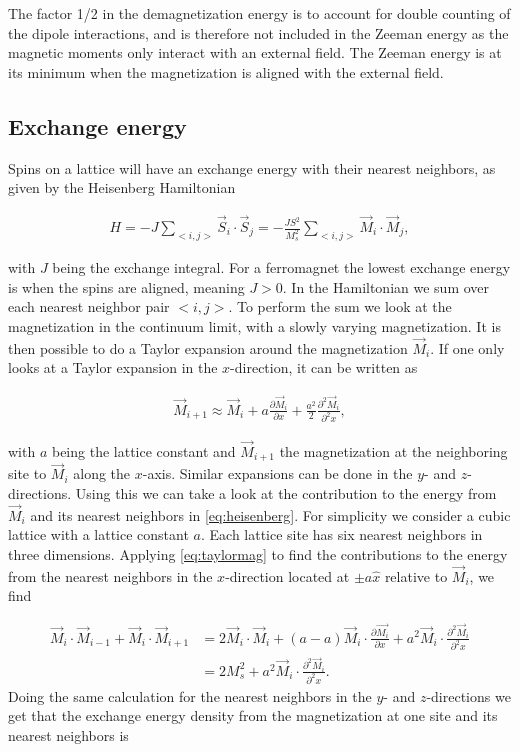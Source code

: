 \documentclass[1p]{elsarticle}		%
\begin{document}
The factor 1/2 in the demagnetization energy is to account for double counting of the dipole interactions, and is therefore not included in the Zeeman energy as the magnetic moments only interact with an external field. The Zeeman energy is at its minimum when the magnetization is aligned with the external field.

\subsection{Exchange energy}
Spins on a lattice will have an exchange energy with their nearest neighbors, as given by the Heisenberg Hamiltonian

\begin{align}
\label{eq:heisenberg}
H = -J\sum_{<i, j>} \vec{S}_i\cdot\vec{S}_j = -\frac{J S^2}{M_s^2}\sum_{<i, j>} \vec{M}_i\cdot\vec{M}_j,
\end{align}

with $J$ being the exchange integral. For a ferromagnet the lowest exchange energy is when the spins are aligned, meaning $J>0$. In the Hamiltonian we sum over each nearest neighbor pair $<i, j>$. To perform the sum we look at the magnetization in the continuum limit, with a slowly varying magnetization. It is then possible to do a Taylor expansion around the magnetization $\vec{M}_i$. If one only looks at a Taylor expansion in the $x$-direction, it can be written as

\begin{align}
\label{eq:taylormag}
\vec{M}_{i+1} \approx \vec{M}_i + a\frac{\partial \vec{M}_i}{\partial x} + \frac{a^2}{2}\frac{\partial^2 \vec{M}_i}{\partial^2 x},
\end{align}

with $a$ being the lattice constant and $\vec{M}_{i+1}$ the magnetization at the neighboring site to $\vec{M}_i$ along the $x$-axis. Similar expansions can be done in the $y$- and $z$-directions. Using this we can take a look at the contribution to the energy from $\vec{M}_i$ and its nearest neighbors in \eqref{eq:heisenberg}. For simplicity we consider a cubic lattice with a lattice constant $a$. Each lattice site has six nearest neighbors in three dimensions. Applying \eqref{eq:taylormag} to find the contributions to the energy from the nearest neighbors in the $x$-direction located at $\pm a \hat{x}$ relative to $\vec{M}_i$, we find

\begin{align*}
\vec{M}_i\cdot\vec{M}_{i-1}+\vec{M}_i\cdot\vec{M}_{i+1} &= 2\vec{M}_i\cdot\vec{M}_i + (a - a) \vec{M}_i\cdot\frac{\partial \vec{M_i}}{\partial x} + a^2\vec{M}_i\cdot\frac{\partial^2 \vec{M}_i}{\partial^2 x} \\
&= 2M_s^2 + a^2\vec{M}_i\cdot\frac{\partial^2 \vec{M}_i}{\partial^2 x}.
\end{align*}
Doing the same calculation for the nearest neighbors in the $y$- and $z$-directions we get that the exchange energy density from the magnetization at one site and its nearest neighbors is
\end{document}
